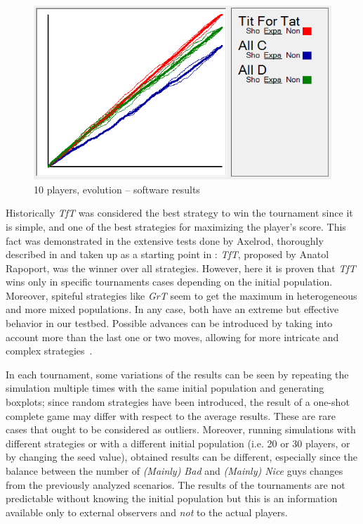 \documentclass[journal,10pt,twoside]{IEEEtran}
\begin{document}
\begin{figure}[!ht]
    \centering
    \includegraphics[width=.9\columnwidth]{../img/ipdmp/ipdmp10-plot-det}
    \caption{10 players, evolution -- software results \cite{demosw}}
    \label{fig:ipdmp10evosw}
\end{figure}

Historically \textit{TfT} was considered the best strategy to win the tournament since it is simple, and one of the best strategies for maximizing the player's score.
This fact was demonstrated in the extensive tests done by Axelrod, thoroughly described in \cite{axelrod1981evolution,axelrod1984evolution} and taken up as a starting point in \cite{mathieu2017}: \textit{TfT}, proposed by Anatol Rapoport, was the winner over all strategies.
However, here it is proven that \textit{TfT} wins only in specific tournaments cases depending on the initial population. Moreover, spiteful strategies like \textit{GrT} seem to get the maximum in heterogeneous and more mixed populations. In any case, both have an extreme but effective behavior in our testbed. Possible advances can be introduced by taking into account more than the last one or two moves, allowing for more intricate and complex strategies~\cite{mathieu2017}.

In each tournament, some variations of the results can be seen by repeating the simulation multiple times with the same initial population and generating boxplots; since random strategies have been introduced, the result of a one-shot complete game may differ with respect to the average results. These are rare cases that ought to be considered as outliers. Moreover, running simulations with different strategies or with a different initial population (i.e. 20 or 30 players, or by changing the seed value), obtained results can be different, especially since the balance between the number of \textit{(Mainly) Bad} and \textit{(Mainly) Nice} guys changes from the previously analyzed scenarios. The results of the tournaments are not predictable without knowing the initial population but this is an information available only to external observers and \textit{not} to the actual players. 
\end{document}
